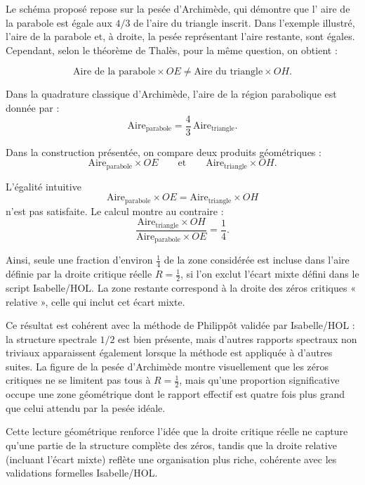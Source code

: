 \documentclass[a4paper,11pt]{article}
\begin{document}
\begin{tcolorbox}[colback=white,colframe=black,title={Quadrature de la parabole et zéros critiques}]
Le schéma proposé repose sur la pesée d'Archimède, qui démontre que l'
aire de la parabole est égale aux $4/3$ de l'aire du triangle inscrit. Dans l'exemple illustré, l'aire de la parabole et, à droite, la pesée représentant l'aire restante, sont égales. Cependant, selon le théorème de Thalès, pour la même question, on obtient :


\[
\text{Aire de la parabole} \times OE \neq \text{Aire du triangle} \times OH.
\]




Dans la quadrature classique d’Archimède, l’aire de la région parabolique est donnée par :
\[
\text{Aire}_{\text{parabole}} = \frac{4}{3}\,\text{Aire}_{\text{triangle}}.
\]

Dans la construction présentée, on compare deux produits géométriques :
\[
\text{Aire}_{\text{parabole}} \times OE
\qquad\text{et}\qquad
\text{Aire}_{\text{triangle}} \times OH.
\]

L’égalité intuitive
\[
\text{Aire}_{\text{parabole}} \times OE = \text{Aire}_{\text{triangle}} \times OH
\]
n’est pas satisfaite. Le calcul montre au contraire :
\[
\frac{\text{Aire}_{\text{triangle}} \times OH}{\text{Aire}_{\text{parabole}} \times OE}
= \frac{1}{4}.
\]

Ainsi, seule une fraction d’environ \(\tfrac{1}{4}\) de la zone considérée est incluse dans l’aire
définie par la droite critique réelle \(R = \tfrac{1}{2}\), si l’on exclut l’écart mixte défini dans
le script Isabelle/HOL. La zone restante correspond à la droite des zéros critiques « relative »,
celle qui inclut cet écart mixte.

Ce résultat est cohérent avec la méthode de Philippôt validée par Isabelle/HOL :  
la structure spectrale \(1/2\) est bien présente, mais d’autres rapports spectraux non triviaux
apparaissent également lorsque la méthode est appliquée à d’autres suites. La figure de la
pesée d’Archimède montre visuellement que les zéros critiques ne se limitent pas tous à
\(R = \tfrac{1}{2}\), mais qu’une proportion significative occupe une zone géométrique dont le
rapport effectif est quatre fois plus grand que celui attendu par la pesée idéale.

Cette lecture géométrique renforce l’idée que la droite critique réelle ne capture qu’une
partie de la structure complète des zéros, tandis que la droite relative (incluant l’écart mixte)
reflète une organisation plus riche, cohérente avec les validations formelles Isabelle/HOL.
\end{tcolorbox}
\end{document}
